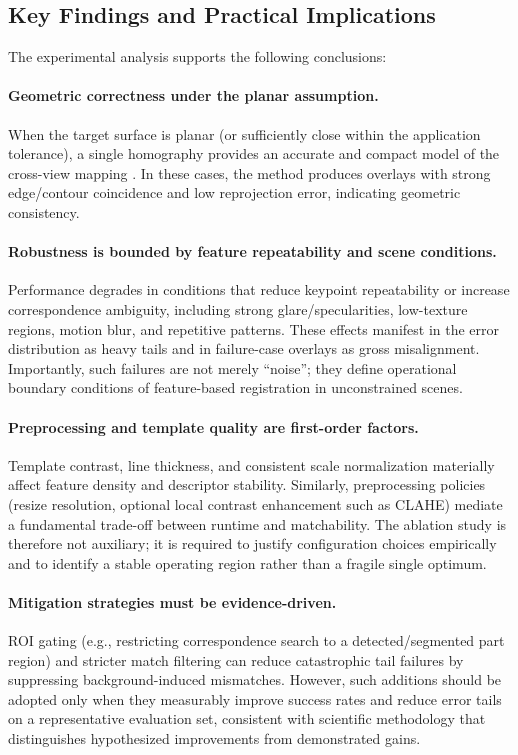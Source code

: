 \subsection{Key Findings and Practical Implications}
The experimental analysis supports the following conclusions:

\paragraph{Geometric correctness under the planar assumption.}
When the target surface is planar (or sufficiently close within the application tolerance), a single homography provides an accurate and compact model of the cross-view mapping \cite{HartleyZisserman2004}. In these cases, the method produces overlays with strong edge/contour coincidence and low reprojection error, indicating geometric consistency.

\paragraph{Robustness is bounded by feature repeatability and scene conditions.}
Performance degrades in conditions that reduce keypoint repeatability or increase correspondence ambiguity, including strong glare/specularities, low-texture regions, motion blur, and repetitive patterns. These effects manifest in the error distribution as heavy tails and in failure-case overlays as gross misalignment. Importantly, such failures are not merely ``noise''; they define operational boundary conditions of feature-based registration in unconstrained scenes.

\paragraph{Preprocessing and template quality are first-order factors.}
Template contrast, line thickness, and consistent scale normalization materially affect feature density and descriptor stability. Similarly, preprocessing policies (resize resolution, optional local contrast enhancement such as CLAHE) mediate a fundamental trade-off between runtime and matchability. The ablation study is therefore not auxiliary; it is required to justify configuration choices empirically and to identify a stable operating region rather than a fragile single optimum.

\paragraph{Mitigation strategies must be evidence-driven.}
ROI gating (e.g., restricting correspondence search to a detected/segmented part region) and stricter match filtering can reduce catastrophic tail failures by suppressing background-induced mismatches. However, such additions should be adopted only when they measurably improve success rates and reduce error tails on a representative evaluation set, consistent with scientific methodology that distinguishes hypothesized improvements from demonstrated gains.

